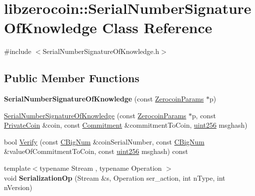 \hypertarget{classlibzerocoin_1_1_serial_number_signature_of_knowledge}{}\section{libzerocoin\+:\+:Serial\+Number\+Signature\+Of\+Knowledge Class Reference}
\label{classlibzerocoin_1_1_serial_number_signature_of_knowledge}


{\ttfamily \#include $<$Serial\+Number\+Signature\+Of\+Knowledge.\+h$>$}

\subsection*{Public Member Functions}
\begin{DoxyCompactItemize}
\item 
\mbox{\label{classlibzerocoin_1_1_serial_number_signature_of_knowledge_abcbaf654d0d45731bec4c2afd32c76bc}} 
{\bfseries Serial\+Number\+Signature\+Of\+Knowledge} (const \mbox{\hyperlink{classlibzerocoin_1_1_zerocoin_params}{Zerocoin\+Params}} $\ast$p)
\item 
\mbox{\hyperlink{classlibzerocoin_1_1_serial_number_signature_of_knowledge_adb04da379098298cad6e05c930d6483f}{Serial\+Number\+Signature\+Of\+Knowledge}} (const \mbox{\hyperlink{classlibzerocoin_1_1_zerocoin_params}{Zerocoin\+Params}} $\ast$p, const \mbox{\hyperlink{classlibzerocoin_1_1_private_coin}{Private\+Coin}} \&coin, const \mbox{\hyperlink{classlibzerocoin_1_1_commitment}{Commitment}} \&commitment\+To\+Coin, \mbox{\hyperlink{classuint256}{uint256}} msghash)
\item 
bool \mbox{\hyperlink{classlibzerocoin_1_1_serial_number_signature_of_knowledge_a05f9c3d5aade741ee8aab51ed570b6b0}{Verify}} (const \mbox{\hyperlink{class_c_big_num}{C\+Big\+Num}} \&coin\+Serial\+Number, const \mbox{\hyperlink{class_c_big_num}{C\+Big\+Num}} \&value\+Of\+Commitment\+To\+Coin, const \mbox{\hyperlink{classuint256}{uint256}} msghash) const
\item 
\mbox{\label{classlibzerocoin_1_1_serial_number_signature_of_knowledge_a2ce04df85116071e75f8d463e584f4eb}} 
{\footnotesize template$<$typename Stream , typename Operation $>$ }\\void {\bfseries Serialization\+Op} (Stream \&s, Operation ser\+\_\+action, int n\+Type, int n\+Version)
\end{DoxyCompactItemize}

